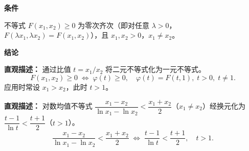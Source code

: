 \begin{statementbox}
	\textbf{\textcolor{CStatement}{条件}}
	\begin{description}[style=nextline, leftmargin=2.8em, labelsep=0.5em, itemsep=0.35em]
		\item[\textbf{\textcolor{CStatement}{条件1（零次齐次）：}}]
			不等式 $F(x_1,x_2)\ge0$ 为零次齐次（即对任意 $\lambda>0$，$F(\lambda x_1,\lambda x_2)=F(x_1,x_2)$），且 $x_1,x_2>0$，$x_1\neq x_2$。
	\end{description}

	\medskip
	\textbf{\textcolor{CStatement}{结论}}
	\begin{description}[style=nextline, leftmargin=2.8em, labelsep=0.5em, itemsep=0.45em]
		\item[\textbf{\textcolor{CStatement}{结论一（比值换元）：}}]
			\textbf{\textcolor{CStatement}{直观描述：}}
			通过比值 $t=x_1/x_2$ 将二元不等式化为一元不等式。
			\[
				F(x_1,x_2)\ge0\;\Longleftrightarrow\;\varphi(t)\ge0,\quad \varphi(t)=F(t,1),\;t>0,\;t\neq1.
			\]
			应用时常设 $x_1>x_2$，此时 $t>1$。
		\item[\textbf{\textcolor{CStatement}{常见变形（对数均值）：}}]
			\textbf{\textcolor{CStatement}{直观描述：}}
			对数均值不等式 $\dfrac{x_1-x_2}{\ln x_1-\ln x_2}<\dfrac{x_1+x_2}{2}$（$x_1\neq x_2$）经换元化为 $\dfrac{t-1}{\ln t}<\dfrac{t+1}{2}$（$t>1$）。
			\[
				\frac{x_1-x_2}{\ln x_1-\ln x_2}<\frac{x_1+x_2}{2}\;\Longleftrightarrow\;\frac{t-1}{\ln t}<\frac{t+1}{2},\quad t>1.
			\]
	\end{description}

\end{statementbox}

